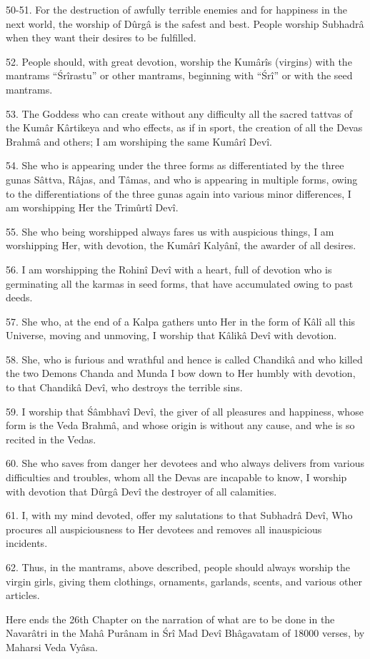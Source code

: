50-51. For the destruction of awfully terrible enemies and for happiness in the next world, the worship of Dûrg\^a is the safest and best. People worship Subhadr\^a when they want their desires to be fulfilled.

52. People should, with great devotion, worship the Kum\^ar\^is (virgins) with the mantrams ``\'Sr\^irastu'' or other mantrams, beginning with ``\'Sr\^i'' or with the seed mantrams.

53. The Goddess who can create without any difficulty all the sacred tattvas of the Kum\^ar K\^artikeya and who effects, as if in sport, the creation of all the Devas Brahm\^a and others; I am worshiping the same Kum\^ar\^i Dev\^i.

54. She who is appearing under the three forms as differentiated by the three gunas S\^attva, R\^ajas, and T\^amas, and who is appearing in multiple forms, owing to the differentiations of the three gunas again into various minor differences, I am worshipping Her the Trimûrt\^i Dev\^i.

55. She who being worshipped always fares us with auspicious things, I am worshipping Her, with devotion, the Kum\^ar\^i Kaly\^an\^i, the awarder of all desires.

56. I am worshipping the Rohin\^i Dev\^i with a heart, full of devotion who is germinating all the karmas in seed forms, that have accumulated owing to past deeds.

57. She who, at the end of a Kalpa gathers unto Her in the form of K\^al\^i all this Universe, moving and unmoving, I worship that K\^alik\^a Dev\^i with devotion.

58. She, who is furious and wrathful and hence is called Chandik\^a and who killed the two Demons Chanda and Munda I bow down to Her humbly with devotion, to that Chandik\^a Dev\^i, who destroys the terrible sins.

59. I worship that \'S\^ambhav\^i Dev\^i, the giver of all pleasures and happiness, whose form is the Veda Brahm\^a, and whose origin is without any cause, and whe is so recited in the Vedas.

60. She who saves from danger her devotees and who always delivers from various difficulties and troubles, whom all the Devas are incapable to know, I worship with devotion that Dûrg\^a Dev\^i the destroyer of all calamities.

61. I, with my mind devoted, offer my salutations to that Subhadr\^a Dev\^i, Who procures all auspiciousness to Her devotees and removes all inauspicious incidents.

62. Thus, in the mantrams, above described, people should always worship the virgin girls, giving them clothings, ornaments, garlands, scents, and various other articles.

Here ends the 26th Chapter on the narration of what are to be done in the Navar\^atri in the Mah\^a Pur\^anam in \'Sr\^i Mad Dev\^i Bh\^agavatam of 18000 verses, by Maharsi Veda Vy\^asa.